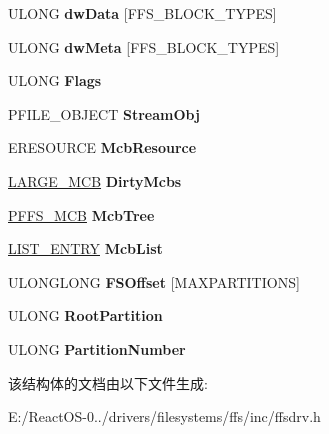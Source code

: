 \begin{DoxyCompactItemize}
U\+L\+O\+NG {\bfseries dw\+Data} \mbox{[}F\+F\+S\+\_\+\+B\+L\+O\+C\+K\+\_\+\+T\+Y\+P\+ES\mbox{]}
\item 
\mbox{\label{struct___f_f_s___v_c_b_a101e2060f84b03762a30f4b8911f3243}} 
U\+L\+O\+NG {\bfseries dw\+Meta} \mbox{[}F\+F\+S\+\_\+\+B\+L\+O\+C\+K\+\_\+\+T\+Y\+P\+ES\mbox{]}
\item 
\mbox{\label{struct___f_f_s___v_c_b_aafe2a9e1a286871874be6eb78d23bbaa}} 
U\+L\+O\+NG {\bfseries Flags}
\item 
\mbox{\label{struct___f_f_s___v_c_b_a419c45623eb2ea768aaa7b7f5ee88ed4}} 
P\+F\+I\+L\+E\+\_\+\+O\+B\+J\+E\+CT {\bfseries Stream\+Obj}
\item 
\mbox{\label{struct___f_f_s___v_c_b_ad92232acf6502d7b560d01a7a1179f85}} 
E\+R\+E\+S\+O\+U\+R\+CE {\bfseries Mcb\+Resource}
\item 
\mbox{\label{struct___f_f_s___v_c_b_a3554c86db3e3a7098a847d6212b77d6c}} 
\hyperlink{struct___l_a_r_g_e___m_c_b}{L\+A\+R\+G\+E\+\_\+\+M\+CB} {\bfseries Dirty\+Mcbs}
\item 
\mbox{\label{struct___f_f_s___v_c_b_a2be49744a6d1a44a7a3e620094de1a24}} 
\hyperlink{struct___f_f_s___m_c_b}{P\+F\+F\+S\+\_\+\+M\+CB} {\bfseries Mcb\+Tree}
\item 
\mbox{\label{struct___f_f_s___v_c_b_ab8453bdefd9380e9a89538ac86fc069e}} 
\hyperlink{struct___l_i_s_t___e_n_t_r_y}{L\+I\+S\+T\+\_\+\+E\+N\+T\+RY} {\bfseries Mcb\+List}
\item 
\mbox{\label{struct___f_f_s___v_c_b_a379a56a84bd97c4abdccbd370c2c92c4}} 
U\+L\+O\+N\+G\+L\+O\+NG {\bfseries F\+S\+Offset} \mbox{[}M\+A\+X\+P\+A\+R\+T\+I\+T\+I\+O\+NS\mbox{]}
\item 
\mbox{\label{struct___f_f_s___v_c_b_af3d45d48633c7b0f05cb5abbd14bf2a8}} 
U\+L\+O\+NG {\bfseries Root\+Partition}
\item 
\mbox{\label{struct___f_f_s___v_c_b_ad074640e83c1c38542669dc8c487ebb1}} 
U\+L\+O\+NG {\bfseries Partition\+Number}
\end{DoxyCompactItemize}


该结构体的文档由以下文件生成\+:\begin{DoxyCompactItemize}
\item 
E\+:/\+React\+O\+S-\/0../drivers/filesystems/ffs/inc/ffsdrv.\+h\end{DoxyCompactItemize}
